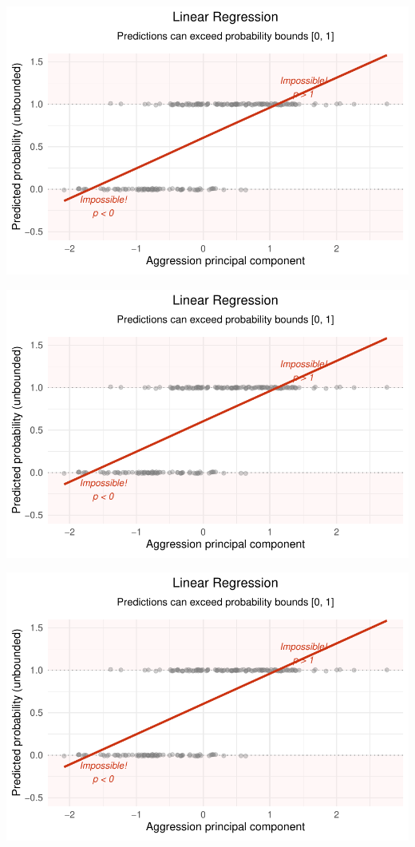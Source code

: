\documentclass[
  letterpaper,
  DIV=11,
  numbers=noendperiod]{scrartcl}
\begin{document}
\begin{center}
\includegraphics[width=0.8\linewidth,height=\textheight,keepaspectratio]{Beyond!!!_files/figure-pdf/unnamed-chunk-4-96.pdf}
\end{center}

\begin{center}
\includegraphics[width=0.8\linewidth,height=\textheight,keepaspectratio]{Beyond!!!_files/figure-pdf/unnamed-chunk-4-97.pdf}
\end{center}

\begin{center}
\includegraphics[width=0.8\linewidth,height=\textheight,keepaspectratio]{Beyond!!!_files/figure-pdf/unnamed-chunk-4-98.pdf}
\end{center}
\end{document}
